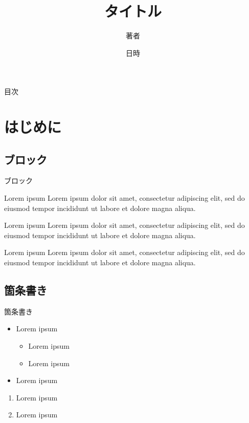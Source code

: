\documentclass[12pt,unicode]{beamer}
\title{タイトル}
\author{著者}
\date{日時}
\begin{document}
  {\maketitle}


  \begin{frame}{目次}
    \tableofcontents
  \end{frame}

  \section{はじめに}
  \subsection{ブロック}
  \begin{frame}{ブロック}
    \begin{block}{Lorem ipsum}
      Lorem ipsum dolor sit amet, consectetur adipiscing elit, sed do eiusmod tempor incididunt ut labore et dolore magna aliqua.
    \end{block}

    \begin{alertblock}{Lorem ipsum}
      Lorem ipsum dolor sit amet, consectetur adipiscing elit, sed do eiusmod tempor incididunt ut labore et dolore magna aliqua.
    \end{alertblock}

    \begin{exampleblock}{Lorem ipsum}
      Lorem ipsum dolor sit amet, consectetur adipiscing elit, sed do eiusmod tempor incididunt ut labore et dolore magna aliqua.
    \end{exampleblock}
  \end{frame}

  \subsection{箇条書き}
  \begin{frame}{箇条書き}
    \begin{itemize}
      \item Lorem ipsum
      \begin{itemize}
        \item Lorem ipsum
        \item Lorem ipsum
      \end{itemize}
      \item Lorem ipsum
    \end{itemize}

    \begin{enumerate}
      \item Lorem ipsum
      \item Lorem ipsum
    \end{enumerate}
  \end{frame}
\end{document}
